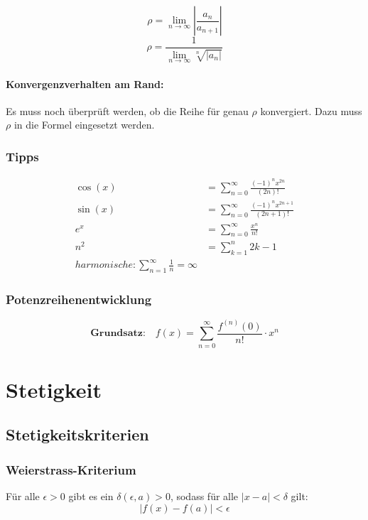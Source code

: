 \documentclass[11pt]{article}
\begin{document}
\begin{equation*}
	\rho= \lim_{n\rightarrow \infty}|\frac{a_n}{a_{n+1}}|
\end{equation*}
\begin{equation*}
	\rho=\frac{1}{\lim_{n\rightarrow \infty}\sqrt[n]{|a_n|}}
\end{equation*}

\paragraph{Konvergenzverhalten am Rand:} Es muss noch überprüft werden, ob die Reihe für genau $\rho$ konvergiert. Dazu muss $\rho$ in die Formel eingesetzt werden.

\subsubsection{Tipps}
\begin{equation*}
\begin{split}
	\cos(x) & = \sum^\infty_{n =0}\frac{(-1)^nx^{2n}}{(2n)!} \\
	\sin(x) & = \sum^\infty_{n =0}\frac{(-1)^nx^{2n+1}}{(2n+1)!} \\
	e^x & = \sum^\infty_{n =0}\frac{x^n}{n!} \\
	n^2 & = \sum_{k=1}^n 2k-1\\
	harmonische: \sum_{n=1}^{\infty}\frac{1}{n}=\infty
\end{split}
\end{equation*}

\subsubsection{Potenzreihenentwicklung}

\begin{equation*}
	\textbf{Grundsatz:} \quad f(x) = \sum_{n=0}^\infty \frac{f^{(n)}(0)}{n!} \cdot x^n
\end{equation*}

\section{Stetigkeit}

\subsection{Stetigkeitskriterien}

\subsubsection*{Weierstrass-Kriterium}
F{\"u}r alle $\epsilon > 0$ gibt es ein $\delta(\epsilon, a) >0$, sodass f{\"u}r alle $|x-a|<\delta$ gilt:
\begin{equation*}
	|f(x) -f(a)|<\epsilon
\end{equation*}
\end{document}
